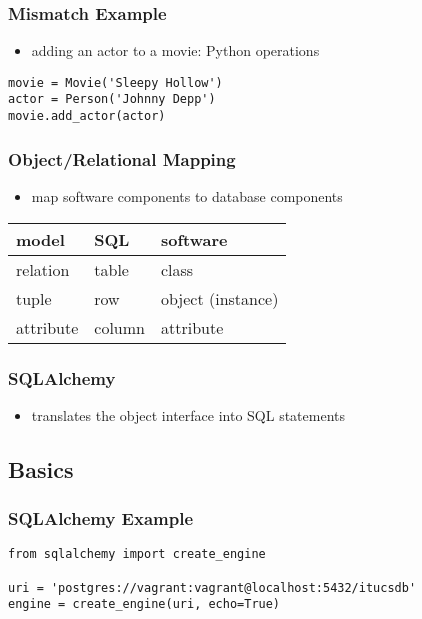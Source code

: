 \documentclass[dvipsnames]{beamer}
\theoremstyle{plain}
\begin{document}
\begin{frame}[fragile]
  \frametitle{Mismatch Example}

  \begin{itemize}
    \item adding an actor to a movie: Python operations
  \end{itemize}

  \begin{lstlisting}
movie = Movie('Sleepy Hollow')
actor = Person('Johnny Depp')
movie.add_actor(actor)
  \end{lstlisting}
\end{frame}

\begin{frame}
  \frametitle{Object/Relational Mapping}

  \begin{itemize}
    \item map software components to database components
  \end{itemize}

  \begin{table}
    \begin{tabular}{|l|l|l|}\hline
model     & SQL    & software\\[2pt]\hline\hline
relation  & table  & class\\\hline
tuple     & row    & object (instance)\\\hline
attribute & column & attribute\\\hline
      \end{tabular}
    \end{table}
\end{frame}

\begin{frame}
  \frametitle{SQLAlchemy}

  \begin{itemize}
    \item translates the object interface into SQL statements
  \end{itemize}
\end{frame}

\subsection{Basics}

\begin{frame}[fragile]
  \frametitle{SQLAlchemy Example}

  \begin{lstlisting}
from sqlalchemy import create_engine

uri = 'postgres://vagrant:vagrant@localhost:5432/itucsdb'
engine = create_engine(uri, echo=True)
  \end{lstlisting}
\end{frame}
\end{document}
